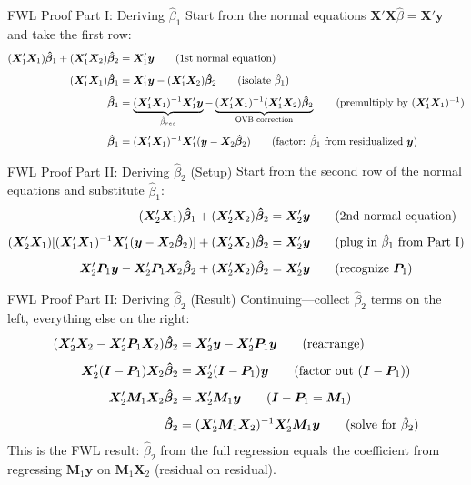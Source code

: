 \documentclass[aspectratio=169, handout, t]{beamer}
\numberwithin{equation}{section}
\begin{document}
\begin{frame}{FWL Proof Part I: Deriving $\hat{\beta}_1$}
Start from the normal equations $\bm{X'X}\hat{\beta}=\bm{X'y}$ and take the first row:
\begin{align*}
(\bm{X}_1'\bm{X}_1)\bm{\hat{\beta}}_1+(\bm{X}_1'\bm{X}_2)\bm{\hat{\beta}}_2&=\bm{X}'_1\bm{y} \tag{1st normal equation}\\[4pt]
(\bm{X}_1'\bm{X}_1)\bm{\hat{\beta}}_1&=\bm{X}'_1\bm{y}-(\bm{X}_1'\bm{X}_2)\bm{\hat{\beta}}_2 \tag{isolate $\hat{\beta}_1$}\\[4pt]
\bm{\hat{\beta}}_1&=\underbrace{(\bm{X}_1'\bm{X}_1)^{-1}\bm{X}'_1\bm{y}}_{\hat{\beta}_{res}}-\underbrace{(\bm{X}_1'\bm{X}_1)^{-1}(\bm{X}_1'\bm{X}_2)\bm{\hat{\beta}}_2}_{\text{OVB correction}} \tag{premultiply by $(\bm{X}_1'\bm{X}_1)^{-1}$}\\[4pt]
\bm{\hat{\beta}}_1&=(\bm{X}_1'\bm{X}_1)^{-1}\bm{X}'_1(\bm{y}-\bm{X}_2\bm{\hat{\beta}}_2) \tag{factor: $\hat{\beta}_1$ from residualized $\bm{y}$}
\end{align*}
\end{frame}

\begin{frame}{FWL Proof Part II: Deriving $\hat{\beta}_2$ (Setup)}
Start from the second row of the normal equations and substitute $\hat{\beta}_1$:
\begin{align*}
(\bm{X}_2'\bm{X}_1)\bm{\hat{\beta}}_1+(\bm{X}_2'\bm{X}_2)\bm{\hat{\beta}}_2&=\bm{X}'_2\bm{y} \tag{2nd normal equation}\\[4pt]
(\bm{X}_2'\bm{X}_1)[(\bm{X}_1'\bm{X}_1)^{-1}\bm{X}'_1(\bm{y}-\bm{X}_2\bm{\hat{\beta}}_2)]+(\bm{X}_2'\bm{X}_2)\bm{\hat{\beta}}_2&=\bm{X}'_2\bm{y} \tag{plug in $\hat{\beta}_1$ from Part I}\\[4pt]
\bm{X}_2'\bm{P}_1\bm{y}-\bm{X}'_2\bm{P}_1\bm{X}_2\bm{\hat{\beta}}_2+(\bm{X}_2'\bm{X}_2)\bm{\hat{\beta}}_2&=\bm{X}'_2\bm{y} \tag{recognize $\bm{P}_1$}
\end{align*}
\end{frame}

\begin{frame}{FWL Proof Part II: Deriving $\hat{\beta}_2$ (Result)}
Continuing---collect $\hat{\beta}_2$ terms on the left, everything else on the right:
\begin{align*}
(\bm{X}_2'\bm{X}_2-\bm{X}'_2\bm{P}_1\bm{X}_2)\bm{\hat{\beta}}_2&=\bm{X}'_2\bm{y}-\bm{X}_2'\bm{P}_1\bm{y} \tag{rearrange}\\[4pt]
\bm{X}_2'(\bm{I}-\bm{P}_1)\bm{X}_2\bm{\hat{\beta}}_2&=\bm{X}'_2(\bm{I}-\bm{P}_1)\bm{y} \tag{factor out $(\bm{I}-\bm{P}_1)$}\\[4pt]
\bm{X}_2'\bm{M}_1\bm{X}_2\bm{\hat{\beta}}_2&=\bm{X}'_2\bm{M}_1\bm{y} \tag{$\bm{I}-\bm{P}_1=\bm{M}_1$}\\[4pt]
\bm{\hat{\beta}}_2&=(\bm{X}_2'\bm{M}_1\bm{X}_2)^{-1}\bm{X}'_2\bm{M}_1\bm{y} \tag{solve for $\hat{\beta}_2$}
\end{align*}
This is the FWL result: $\hat{\beta}_2$ from the full regression equals the coefficient from regressing $\bm{M}_1\bm{y}$ on $\bm{M}_1\bm{X}_2$ (residual on residual).
\end{frame}
\end{document}
